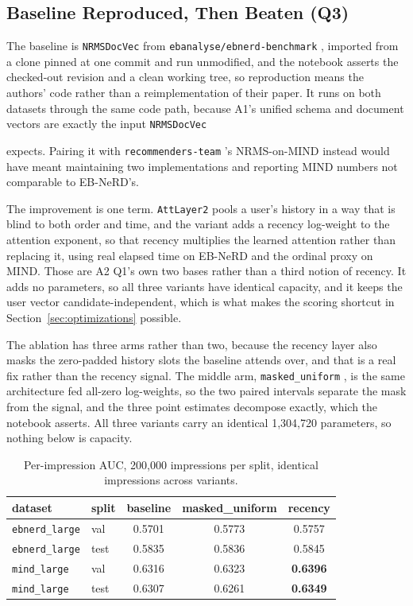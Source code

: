 \documentclass[11pt]{article}
\newcommand{\code}[1]{%
    \colorbox{gray!40}{\texttt{#1}}%
}
\begin{document}
\subsection{Baseline Reproduced, Then Beaten (Q3)}
\label{sec:baseline}

The baseline is \code{NRMSDocVec} from \code{ebanalyse/ebnerd-benchmark},
imported from a clone pinned at one commit and run unmodified, and the
notebook asserts the checked-out revision and a clean working tree, so
reproduction means the authors' code rather than a reimplementation of their
paper. It runs on both datasets through the same code path, because A1's
unified schema and document vectors are exactly the input \code{NRMSDocVec}
expects. Pairing it with \code{recommenders-team}'s NRMS-on-MIND instead would
have meant maintaining two implementations and reporting MIND numbers not
comparable to EB-NeRD's.

The improvement is one term. \code{AttLayer2} pools a user's history in a way
that is blind to both order and time, and the variant adds a recency
log-weight to the attention exponent, so that recency multiplies the learned
attention rather than replacing it, using real elapsed time on EB-NeRD and the
ordinal proxy on MIND. Those are A2 Q1's own two bases rather than a third
notion of recency. It adds no parameters, so all three variants have identical
capacity, and it keeps the user vector candidate-independent, which is what
makes the scoring shortcut in Section~\ref{sec:optimizations} possible.

The ablation has three arms rather than two, because the recency layer also
masks the zero-padded history slots the baseline attends over, and that is a
real fix rather than the recency signal. The middle arm,
\code{masked\_uniform}, is the same architecture fed all-zero log-weights, so
the two paired intervals separate the mask from the signal, and the three
point estimates decompose exactly, which the notebook asserts. All three
variants carry an identical 1,304,720 parameters, so nothing below is
capacity.

\begin{table}[h]
\centering
\begin{tabular}{llccc}
\toprule
dataset & split & baseline & masked\_uniform & recency \\
\midrule
\code{ebnerd\_large} & val  & 0.5701 & 0.5773 & 0.5757 \\
\code{ebnerd\_large} & test & 0.5835 & 0.5836 & 0.5845 \\
\code{mind\_large}   & val  & 0.6316 & 0.6323 & \textbf{0.6396} \\
\code{mind\_large}   & test & 0.6307 & 0.6261 & \textbf{0.6349} \\
\bottomrule
\end{tabular}
\caption{Per-impression AUC, 200,000 impressions per split, identical
impressions across variants.}
\label{tab:nrms-ablation}
\end{table}
\end{document}
